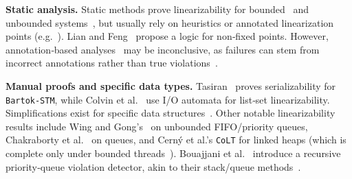 

\medskip
\noindent
\textbf{Static analysis.}
Static methods prove linearizability for bounded~\cite{AmRiReSaYa07,MaLeSaRaBe08} and unbounded systems~\cite{BeLeMaRaSa08,Va09,Va10}, but usually rely on heuristics or annotated linearization points (e.g.~\cite{DrPe14}).  
	Lian and Feng~\cite{LiFe13} propose a logic for non‐fixed points.  
	However, annotation‐based analyses~\cite{OhRiVeYaYo10,ZhPeHa15,AbJoTr16} may be inconclusive, as failures can stem from incorrect annotations rather than true violations~\cite{BoEmCoHa15}.

\medskip
\noindent
\textbf{Manual proofs and specific data types.}
Tasiran~\cite{Ta08} proves serializability for \texttt{Bartok-STM}, while Colvin et al.~\cite{CoGrLuMo06} use I/O automata for list‐set linearizability.  
	Simplifications exist for specific data structures~\cite{BoEmEnMu17,FeEnMoRiSh18}.
	Other notable linearizability results include Wing and Gong's~\cite{WiGo93} on unbounded FIFO/priority queues, Chakraborty et al.~\cite{ChHeSeVa15} on queues, and Cerný et al.’s \texttt{CoLT} for linked heaps (which is complete only under bounded threads~\cite{CeRaZuChAl10}).  
	Bouajjani et al.~\cite{BoEnWa17} introduce a recursive priority‐queue violation detector, akin to their stack/queue methods~\cite{BoEmEnHa18}.


